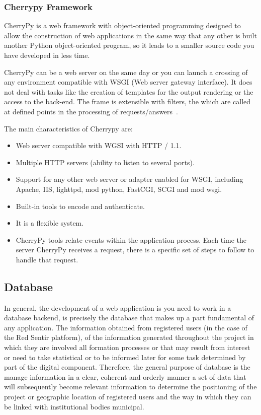 \documentclass[journal,transmag]{IEEEtran}
\begin{document}
\subsubsection{Cherrypy Framework}\label{sub:cherrypy}
CherryPy is a web framework with object-oriented programming designed to allow the construction of web applications in the same way that any other is built another Python object-oriented program, so it leads to a smaller source code you have developed in less time. 

CherryPy can be a web server on the same day or you can launch a crossing of any environment compatible with WSGI (Web server gateway interface). It does not deal with tasks like the creation of templates for the output rendering or the access to the back-end. The frame is extensible with filters, the which are called at defined points in the processing of requests/answers~\cite{Cherrypy}.

The main characteristics of Cherrypy are:

\begin{itemize}
	\item Web server compatible with WGSI with HTTP / 1.1.
	\item Multiple HTTP servers (ability to listen to several ports).
	\item Support for any other web server or adapter enabled for WSGI, including Apache, IIS, lighttpd, mod python, FastCGI, SCGI and mod wsgi.
	\item Built-in tools to encode and authenticate.
	\item It is a flexible system.
	\item CherryPy tools relate events within the application process. Each time the server CherryPy receives a request, there is a specific set of steps to follow to handle that request.
\end{itemize}

\subsection{Database}
In general, the development of a web application is you need to work in a database backend,
is precisely the database that makes up a part fundamental of any application. The information obtained from registered users (in the case of the Red Sentir platform), of the information generated throughout the project in which they are involved all formation processes or that may result from interest or need to take statistical or to be informed later for some task determined by part of the digital component. Therefore, the general purpose of database is the manage information in a clear, coherent and orderly manner a set of data that will subsequently become relevant information to determine the positioning of the project or geographic location of registered users and the way in which they can be linked with institutional bodies municipal.
\end{document}
